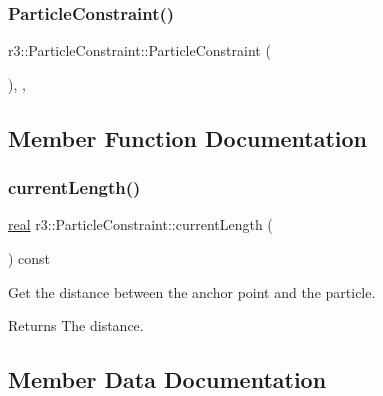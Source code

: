 \subsubsection{\texorpdfstring{Particle\+Constraint()}{ParticleConstraint()}}
{\footnotesize\ttfamily r3\+::\+Particle\+Constraint\+::\+Particle\+Constraint (\begin{DoxyParamCaption}{ }\end{DoxyParamCaption})\hspace{0.3cm}{\ttfamily [explicit]}, {\ttfamily [protected]}, {\ttfamily [default]}}



\subsection{Member Function Documentation}
\mbox{\label{classr3_1_1_particle_constraint_a0d466805c43b474d389609faba308cc0}} 
\subsubsection{\texorpdfstring{current\+Length()}{currentLength()}}
{\footnotesize\ttfamily \mbox{\hyperlink{namespacer3_ab2016b3e3f743fb735afce242f0dc1eb}{real}} r3\+::\+Particle\+Constraint\+::current\+Length (\begin{DoxyParamCaption}{ }\end{DoxyParamCaption}) const\hspace{0.3cm}{\ttfamily [protected]}}



Get the distance between the anchor point and the particle. 

\begin{DoxyReturn}{Returns}
The distance. 
\end{DoxyReturn}


\subsection{Member Data Documentation}
\mbox{\label{classr3_1_1_particle_constraint_a71ad1de9d86203dbd27059107dc40a9b}} 
